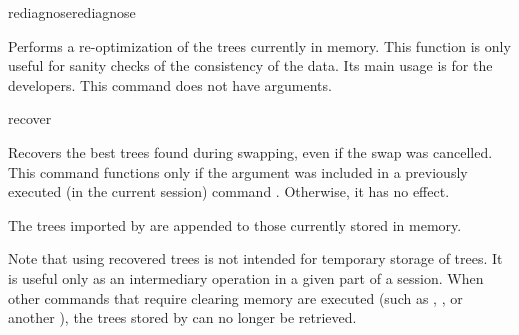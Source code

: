 \begin{command}{rediagnose}{rediagnose}

	\syntax{\obligatory{()}}

	\begin{poydescription}
        Performs a re-optimization of the trees currently in memory. This
        function is only useful for sanity checks of the consistency of the data.
        Its main usage is for the \poy developers. This command does not have
        arguments.
	\end{poydescription}

    \begin{poyexamples}
    \end{poyexamples}

\end{command}

\begin{command}{recover}{}
    \syntax{\obligatory{()}}

    \begin{poydescription}
            Recovers the best trees found during swapping, even if the swap was
            cancelled. This command functions only if the argument  
            was included in a previously executed 
            (in the current \poy session) command . Otherwise, it has no effect.
	
	The trees imported by  are appended to those currently
	stored in memory.
	
	Note that using recovered trees is not intended for temporary storage of trees.
	It is useful only as an intermediary operation in a given part of a \poy session. When
	other commands that require clearing memory are executed (such as
	, , or another
	),
	the trees stored by  can no longer be retrieved.
            
    \end{poydescription}

    \begin{poyexamples}
    \end{poyexamples}

    \begin{poyalso}
    \end{poyalso}
\end{command}

